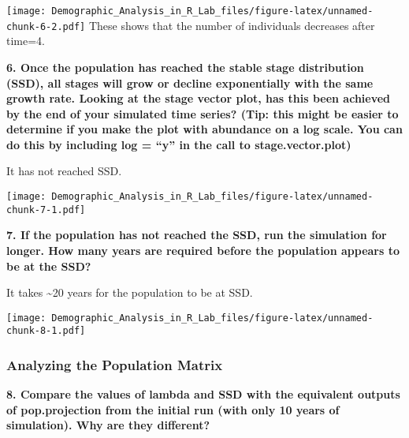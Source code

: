 \documentclass[]{article}
\newenvironment{Shaded}{\begin{snugshade}}{\end{snugshade}}
\newcommand{\KeywordTok}[1]{\textcolor[rgb]{0.13,0.29,0.53}{\textbf{#1}}}
\newcommand{\DataTypeTok}[1]{\textcolor[rgb]{0.13,0.29,0.53}{#1}}
\newcommand{\DecValTok}[1]{\textcolor[rgb]{0.00,0.00,0.81}{#1}}
\newcommand{\StringTok}[1]{\textcolor[rgb]{0.31,0.60,0.02}{#1}}
\newcommand{\CommentTok}[1]{\textcolor[rgb]{0.56,0.35,0.01}{\textit{#1}}}
\newcommand{\OperatorTok}[1]{\textcolor[rgb]{0.81,0.36,0.00}{\textbf{#1}}}
\newcommand{\NormalTok}[1]{#1}
\begin{document}
\texttt{[image: Demographic\_Analysis\_in\_R\_Lab\_files/figure-latex/unnamed-chunk-6-2.pdf]}
These shows that the number of individuals decreases after time=4.

\textbf{6. Once the population has reached the stable stage distribution
(SSD), all stages will grow or decline exponentially with the same
growth rate. Looking at the stage vector plot, has this been achieved by
the end of your simulated time series? (Tip: this might be easier to
determine if you make the plot with abundance on a log scale. You can do
this by including log = ``y'' in the call to stage.vector.plot) }

It has not reached SSD.

\begin{Shaded}
\end{Shaded}

\texttt{[image: Demographic\_Analysis\_in\_R\_Lab\_files/figure-latex/unnamed-chunk-7-1.pdf]}

\textbf{7. If the population has not reached the SSD, run the simulation
for longer. How many years are required before the population appears to
be at the SSD?}

It takes \textasciitilde{}20 years for the population to be at SSD.

\begin{Shaded}
\end{Shaded}

\texttt{[image: Demographic\_Analysis\_in\_R\_Lab\_files/figure-latex/unnamed-chunk-8-1.pdf]}

\subsubsection{Analyzing the Population
Matrix}\label{analyzing-the-population-matrix}

\textbf{8. Compare the values of lambda and SSD with the equivalent
outputs of pop.projection from the initial run (with only 10 years of
simulation). Why are they different? }
\end{document}
